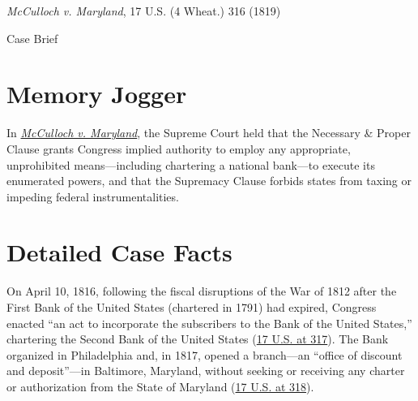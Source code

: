 \documentclass[12pt]{article}
\begin{document}
\begin{center}
{\LARGE \textit{McCulloch v. Maryland}, 17 U.S. (4 Wheat.) 316 (1819)\par}
\vspace{0.8em}
{\large Case Brief\par}
\end{center}
\vspace{1em}

\section{Memory Jogger}

In \textit{\href{https://www.courtlistener.com/opinion/85272/mculloch-v-state-of-maryland/}{McCulloch v. Maryland}}, the Supreme Court held that the Necessary \& Proper Clause grants Congress implied authority to employ any appropriate, unprohibited means---including chartering a national bank---to execute its enumerated powers, and that the Supremacy Clause forbids states from taxing or impeding federal instrumentalities.

\section{Detailed Case Facts}

On April 10, 1816, following the fiscal disruptions of the War of 1812 after the First Bank of the United States (chartered in 1791) had expired, Congress enacted ``an act to incorporate the subscribers to the Bank of the United States,'' chartering the Second Bank of the United States (\href{https://supreme.justia.com/cases/federal/us/17/316/}{17 U.S. at 317}). The Bank organized in Philadelphia and, in 1817, opened a branch---an ``office of discount and deposit''---in Baltimore, Maryland, without seeking or receiving any charter or authorization from the State of Maryland (\href{https://supreme.justia.com/cases/federal/us/17/316/}{17 U.S. at 318}).
\end{document}
